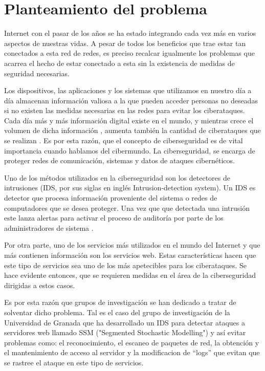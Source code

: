 \section*{Planteamiento del problema}

Internet con el pasar de los años se ha estado integrando cada vez más en varios aspectos de nuestras vidas. A pesar de todos los beneficios que trae estar tan conectados a esta red de redes, es preciso recalcar igualmente los problemas que acarrea el hecho de estar conectado a esta sin la existencia de medidas de seguridad necesarias. 

Los dispositivos, las aplicaciones y los sistemas que utilizamos en nuestro día a día almacenan información valiosa a la que pueden acceder personas no deseadas si no existen las medidas necesarias en las redes para evitar los ciberataques. Cada día más y más información digital existe en el mundo, y mientras crece el volumen de dicha información , aumenta también la cantidad de ciberataques que se realizan \cite{pwc}. Es por esta razón, que el concepto de ciberseguridad es de vital importancia cuando hablamos del cibermundo.  La ciberseguridad, se encarga de proteger redes de comunicación, sistemas y datos de ataques cibernéticos. 

Uno de los métodos utilizados en la ciberseguridad son los detectores de intrusiones (IDS, por sus siglas en inglés Intrusion-detection system). Un IDS es detector que procesa información proveniente del sistema o redes de computadores que se desea proteger. Una vez que que detectada una intrusión este lanza alertas para activar el proceso de auditoría por parte de los administradores de sistema \cite{IDS}. 

Por otra parte, uno de los servicios más utilizados en el mundo del Internet y que más contienen información son los servicios web. Estas características hacen que este tipo de servicios sea uno de los más apetecibles para los ciberataques. Se hace evidente entonces, que se requieren medidas en el área de la ciberseguridad dirigidas a estos casos.

Es por esta razón que grupos de investigación se han dedicado a tratar de solventar dicho problema. Tal es el caso del grupo de investigación de la Universidad de Granada que  ha desarrollado un IDS para detectar ataques a servidores web llamado SSM ("Segmented Stochastic Modelling") y así evitar problemas como: el reconocimiento, el escaneo de paquetes de red, la obtención y el mantenimiento de acceso al servidor y la modificacion de ``logs'' que evitan que se rastree el ataque en este tipo de servicios.

